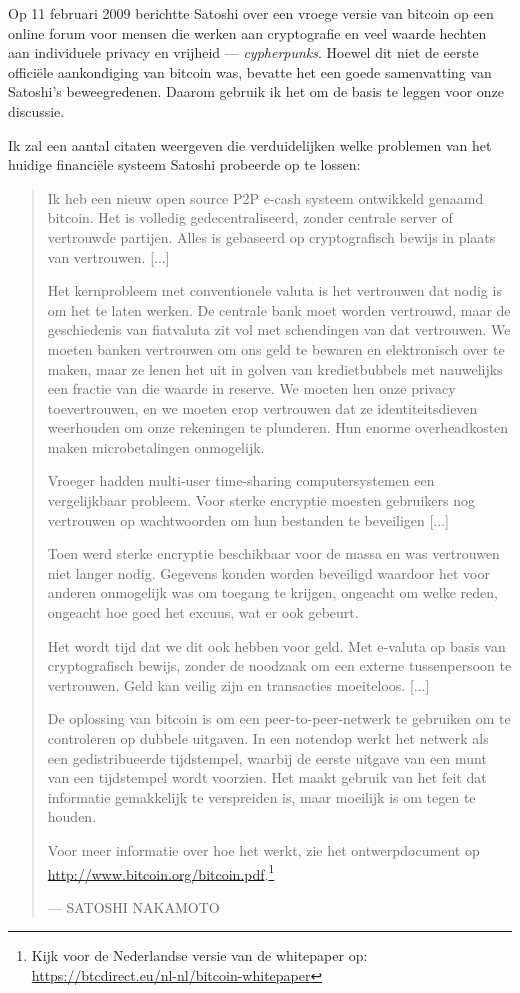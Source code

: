 Op 11 februari 2009 berichtte Satoshi over een vroege versie van bitcoin op een online forum voor mensen die werken aan cryptografie en veel waarde hechten aan individuele privacy en vrijheid --- \textit{cypherpunks}. Hoewel dit niet de eerste officiële aankondiging van bitcoin was, bevatte het een goede samenvatting van Satoshi's beweegredenen. Daarom gebruik ik het om de basis te leggen voor onze discussie.

Ik zal een aantal citaten weergeven die verduidelijken welke problemen van het huidige financiële systeem Satoshi probeerde op te lossen:

\begin{quotation}
Ik heb een nieuw open source P2P e-cash systeem ontwikkeld genaamd bitcoin. Het is volledig gedecentraliseerd, zonder centrale server of vertrouwde partijen. Alles is gebaseerd op cryptografisch bewijs in plaats van vertrouwen. [...]

Het kernprobleem met conventionele valuta is het vertrouwen dat nodig is om het te laten werken. De centrale bank moet worden vertrouwd, maar de geschiedenis van fiatvaluta zit vol met schendingen van dat vertrouwen. We moeten banken vertrouwen om ons geld te bewaren en elektronisch over te maken, maar ze lenen het uit in golven van kredietbubbels met nauwelijks een fractie van die waarde in reserve. We moeten hen onze privacy toevertrouwen, en we moeten erop vertrouwen dat ze identiteitsdieven weerhouden om onze rekeningen te plunderen. Hun enorme overheadkosten maken microbetalingen onmogelijk.

Vroeger hadden \textquotedbl{}multi-user time-sharing computersystemen\textquotedbl{} een vergelijkbaar probleem. Voor sterke encryptie moesten gebruikers nog vertrouwen op wachtwoorden om hun bestanden te beveiligen [...]

Toen werd sterke encryptie beschikbaar voor de massa en was vertrouwen niet langer nodig. Gegevens konden worden beveiligd waardoor het voor anderen onmogelijk was om toegang te krijgen, ongeacht om welke reden, ongeacht hoe goed het excuus, wat er ook gebeurt.

Het wordt tijd dat we dit ook hebben voor geld. Met e-valuta op basis van cryptografisch bewijs, zonder de noodzaak om een externe tussenpersoon te vertrouwen. Geld kan veilig zijn en transacties moeiteloos. [...]

De oplossing van bitcoin is om een peer-to-peer-netwerk te gebruiken om te controleren op dubbele uitgaven. In een notendop werkt het netwerk als een gedistribueerde tijdstempel, waarbij de eerste uitgave van een munt van een tijdstempel wordt voorzien. Het maakt gebruik van het feit dat informatie gemakkelijk te verspreiden is, maar moeilijk is om tegen te houden.

Voor meer informatie over hoe het werkt, zie het ontwerpdocument op \href{http://www.bitcoin.org/bitcoin.pdf}{http://www.bitcoin.org/bitcoin.pdf}.\footnote{Kijk voor de Nederlandse versie van de whitepaper op: \href{https://btcdirect.eu/nl-nl/bitcoin-whitepaper}{https://btcdirect.eu/nl-nl/bitcoin-whitepaper}}
\par\raggedleft--- \textup{SATOSHI NAKAMOTO}
\end{quotation}

